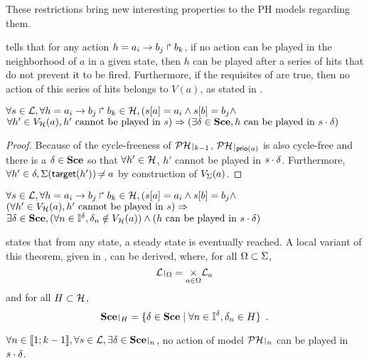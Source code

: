 These restrictions bring new interesting properties to the PH models regarding them.

 tells that for any action $h = a_i\rightarrow b_j\Rsh b_k$, if no action can be played in the neighborhood of $a$ in a given state, then $h$ can be played after a series of hits that do not prevent it to be fired. Furthermore, if the requisites of  are true, then no action of this series of hits belongs to $V(a)$, as stated in .
\begin{theorem}
\label{th:vplay}
  $\forall s \in \mathcal{L}, \forall h = a_i\rightarrow b_j\Rsh b_k \in \mathcal{H}, ({s[a]} = a_i \wedge {s[b]} = b_j \wedge $\\
  $\forall h' \in V_{\mathcal{H}}(a), \text{$h'$ cannot be played in $s$}) \Rightarrow (\exists \delta \in \mathbf{Sce}, \text{$h$ can be played in $s \cdot \delta$})$
\end{theorem}

\begin{proof}
  Because of the cycle-freeness of $\restriction{\PH}{k-1}$, $\restriction{\PH}{\prio(a)}$ is also cycle-free and there is a $\delta \in \mathbf{Sce}$ so that $\forall h' \in \mathcal{H}$, $h'$ cannot be played in $s \cdot \delta$. Furthermore, $\forall h' \in \delta, \Sigma(\mathsf{target}(h')) \not\nobreak\mkern -2mu = a$ by construction of $V_\Sigma(a)$.
\end{proof}


\begin{corollary}
  \label{co:vplay}
  $\forall s \in \mathcal{L}, \forall h = a_i\rightarrow b_j\Rsh b_k \in \mathcal{H}, ({s[a]} = a_i \wedge {s[b]} = b_j \wedge $\\
  $(\forall h' \in V_{\mathcal{H}}(a), \text{$h'$ cannot be played in $s$}) \Rightarrow$\\
  $\exists \delta \in \mathbf{Sce}, (\forall n \in \mathbb{I}^{\delta}, \delta_n \notin V_{\mathcal{H}}(a)) \wedge (\text{$h$ can be played in $s \cdot \delta$})$
\end{corollary}

 states that from any state, a steady state is eventually reached. A local variant of this theorem, given in , can be derived,
where, for all $\Omega \subset \Sigma$, $$\restriction{\PHl}{\Omega} = \underset{a \in \Omega}{\times} \PHl_a$$ and
for all $H \subset \mathcal{H}$, $$\restriction{\Sce}{H} = \{ \delta \in \Sce \mid \forall n \in \indexes{\delta}, \delta_n \in H \} \enspace .$$
\begin{theorem}
\label{th:totalss}
  $\forall n \in \segm{1}{k-1}, \forall s \in \PHl, \exists \delta \in \restriction{\Sce}{n}$, no action of model $\restriction{\PH}{n}$ can be played in $s \cdot \delta$.
\end{theorem}

